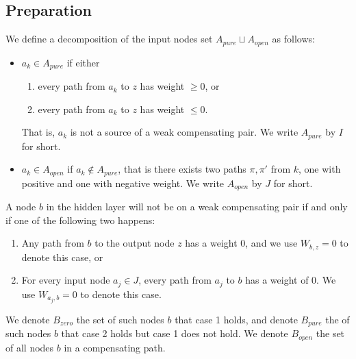 				
				\subsection{Preparation}
				
				
				
				
				\begin{definition}
					We define a decomposition of the input nodes set $A_{pure}\sqcup A_{open}$ as follows:  
					\begin{itemize}
						\item $a_k \in A_{pure}$  if either
						\begin{enumerate}
							\item every path from $a_k$ to $z$ has weight $\geq 0$, or
							\item every path from $a_k$ to $z$ has weight $\leq 0$. 
						
						\end{enumerate}
						That is, $a_k$ is not a source of a weak compensating pair. 	We write $A_{pure}$ by $I$ for short.
						\item $a_k \in A_{open}$ if $a_k \notin A_{pure}$, that is there exists two paths $\pi,\pi'$ from $k$, 
						one with positive and one with negative weight. 	We write $A_{open}$ by $J$ for short.
					\end{itemize}
				\end{definition} 
				
				
				
				\begin{lemma} \label{lem:open_node_2}
					A node $b$ in the hidden layer will not be on a weak compensating pair if and only if one of the following two happens:
					\begin{enumerate}
						\item Any path from $b$ to the output node $z$ has a weight $0$, and we use $W_{b,z}=0$ to denote this case, or
						\item For every input node $a_j\in J$, every path from $a_j$ to $b$ has a weight of $0$. We use $W_{a_j,b}=0$ to denote this case.
					\end{enumerate}
				
				\end{lemma}
				
					We denote $B_{zero}$ the set of such nodes $b$ that case 1 holds, and denote $B_{pure}$ the of such nodes $b$ that case 2 holds but case 1 does not hold.	We denote $B_{open}$ the set of all nodes $b$ in a compensating path.
				
